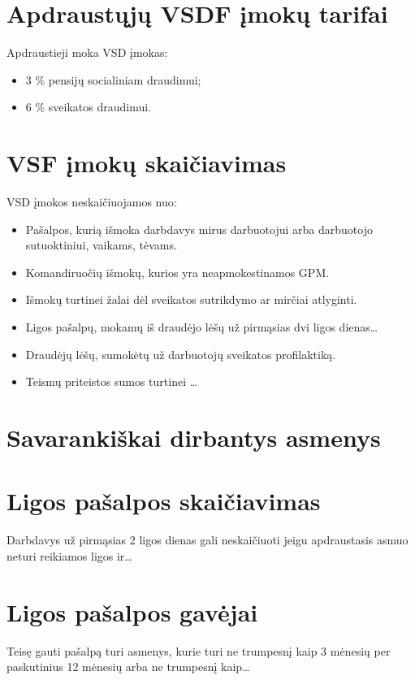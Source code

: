\section{Apdraustųjų VSDF įmokų tarifai}

Apdraustieji moka VSD įmokas:
\begin{itemize}
  \item 3 \% pensijų socialiniam draudimui;
  \item 6 \% sveikatos draudimui.
\end{itemize}

\section{VSF įmokų skaičiavimas}

VSD įmokos neskaičiuojamos nuo:
\begin{itemize}
  \item Pašalpos, kurią išmoka darbdavys mirus darbuotojui arba darbuotojo
    sutuoktiniui, vaikams, tėvams.
  \item Komandiruočių išmokų, kurios yra neapmokestinamos GPM.
  \item Išmokų turtinei žalai dėl sveikatos sutrikdymo ar mirčiai
    atlyginti.
  \item Ligos pašalpų, mokamų iš draudėjo lėšų už pirmąsias dvi
    ligos dienas…
  \item Draudėjų lėšų, sumokėtų už darbuotojų sveikatos profilaktiką.
  \item Teismų priteistos sumos turtinei …
\end{itemize}

\section{Savarankiškai dirbantys asmenys}

\section{Ligos pašalpos skaičiavimas}

Darbdavys už pirmąsias 2 ligos dienas gali neskaičiuoti jeigu
apdraustasis asmuo neturi reikiamos ligos ir…

\section{Ligos pašalpos gavėjai}

Teisę gauti pašalpą turi asmenys, kurie turi ne trumpesnį kaip
3 mėnesių per paskutinius 12 mėnesių arba ne trumpesnį kaip…

